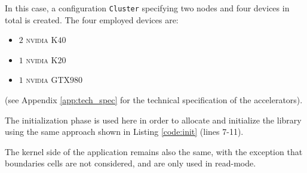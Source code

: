 In this case, a configuration \texttt{Cluster} specifying two nodes and four devices in total is created. The four employed devices are: 
\begin{itemize}
    \item $2$ \textsc{nvidia} K$40$
    \item $1$ \textsc{nvidia} K$20$
    \item $1$ \textsc{nvidia} GTX$980$
\end{itemize}
(see Appendix \ref{app:tech_spec} for the technical specification of the accelerators).

The initialization phase is used here in order to allocate and initialize the library using the same approach shown in Listing \ref{code:init} (lines 7-11).

The kernel side of the application remains also the same, with the exception that boundaries cells are not considered, and are only used in read-mode. 

